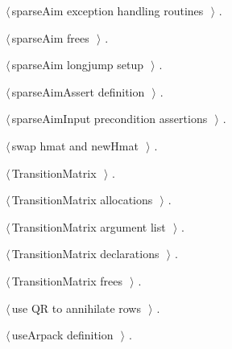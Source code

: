 \documentclass{article}
\begin{document}
{\begin{list}{}{\setlength{\itemsep}{-\parsep}\setlength{\itemindent}{-\leftmargin}}
\item $\langle\,$sparseAim exception handling routines\nobreak\ {\footnotesize {}}$\,\rangle$ {\footnotesize {\NWtxtRefIn} .}
\item $\langle\,$sparseAim frees\nobreak\ {\footnotesize {}}$\,\rangle$ {\footnotesize {\NWtxtRefIn} .}
\item $\langle\,$sparseAim longjump setup\nobreak\ {\footnotesize {}}$\,\rangle$ {\footnotesize {\NWtxtRefIn} .}
\item $\langle\,$sparseAimAssert definition\nobreak\ {\footnotesize {}}$\,\rangle$ {\footnotesize {\NWtxtRefIn} .
}
\item $\langle\,$sparseAimInput precondition assertions\nobreak\ {\footnotesize {}}$\,\rangle$ {\footnotesize {\NWtxtRefIn} .}
\item $\langle\,$swap hmat and newHmat\nobreak\ {\footnotesize {}}$\,\rangle$ {\footnotesize {\NWtxtRefIn} .}
\item $\langle\,$TransitionMatrix\nobreak\ {\footnotesize {}}$\,\rangle$ {\footnotesize {\NWtxtRefIn} .}
\item $\langle\,$TransitionMatrix allocations\nobreak\ {\footnotesize {}}$\,\rangle$ {\footnotesize {\NWtxtRefIn} .}
\item $\langle\,$TransitionMatrix argument list\nobreak\ {\footnotesize {}}$\,\rangle$ {\footnotesize {\NWtxtRefIn} .
}
\item $\langle\,$TransitionMatrix declarations\nobreak\ {\footnotesize {}}$\,\rangle$ {\footnotesize {\NWtxtRefIn} .}
\item $\langle\,$TransitionMatrix frees\nobreak\ {\footnotesize {}}$\,\rangle$ {\footnotesize {\NWtxtRefIn} .}
\item $\langle\,$use QR to annihilate rows\nobreak\ {\footnotesize {}}$\,\rangle$ {\footnotesize {\NWtxtRefIn} .}
\item $\langle\,$useArpack definition\nobreak\ {\footnotesize {}}$\,\rangle$ {\footnotesize {\NWtxtRefIn} .}
\end{list}}
\end{document}
